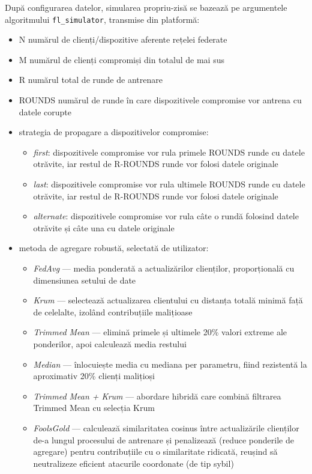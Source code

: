 \documentclass[../../main.tex]{subfiles}
\begin{document}
    După configurarea datelor, simularea propriu-zisă se bazează pe argumentele algoritmului \texttt{fl\_simulator}, transmise din platformă:

    \begin{itemize}
        \item N numărul de clienți/dispozitive aferente rețelei federate
            \item M numărul de clienți compromiși din totalul de mai sus
        \item R numărul total de runde de antrenare
        \item ROUNDS numărul de runde în care dispozitivele compromise vor antrena cu datele corupte
        \item strategia de propagare a dispozitivelor compromise:
        \begin{itemize}
            \item \textit{first}: dispozitivele compromise vor rula primele ROUNDS runde cu datele otrăvite, iar restul de R-ROUNDS runde vor folosi datele originale
            \item \textit{last}: dispozitivele compromise vor rula ultimele ROUNDS runde cu datele otrăvite, iar restul de R-ROUNDS runde vor folosi datele originale
                \item \textit{alternate}: dispozitivele compromise vor rula câte o rundă folosind datele otrăvite și câte una cu datele originale
        \end{itemize}
        \item metoda de agregare robustă, selectată de utilizator:
        \begin{itemize}
            \item \textit{FedAvg} --- media ponderată a actualizărilor clienților, proporțională cu dimensiunea setului de date
            \item \textit{Krum} --- selectează actualizarea clientului cu distanța totală minimă față de celelalte, izolând contribuțiile malițioase
            \item \textit{Trimmed Mean} --- elimină primele și ultimele 20\% valori extreme ale ponderilor, apoi calculează media restului
            \item \textit{Median} --- înlocuiește media cu mediana per parametru, fiind rezistentă la aproximativ 20\% clienți malițioși
            \item \textit{Trimmed Mean + Krum} --- abordare hibridă care combină filtrarea Trimmed Mean cu selecția Krum
            \item \textit{FoolsGold} \cite{fung2020mitigating} --- calculează similaritatea cosinus între actualizările clienților de-a lungul procesului de antrenare și penalizează (reduce ponderile de agregare) pentru contribuțiile cu o similaritate ridicată, reușind să neutralizeze eficient atacurile coordonate (de tip sybil)

\end{itemize}
\end{itemize}
\end{document}
